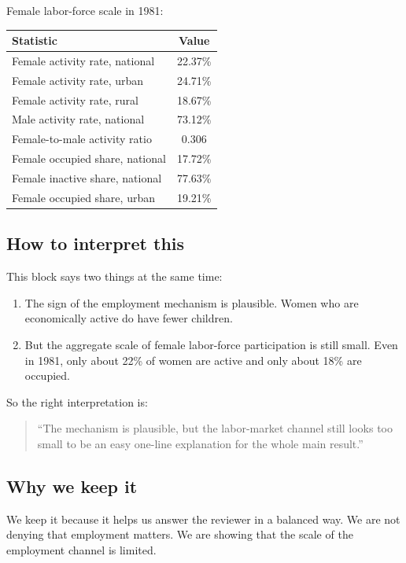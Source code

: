 \documentclass[11pt]{article}
\begin{document}
Female labor-force scale in 1981:

\begin{center}
\begin{tabular}{lc}
\toprule
Statistic & Value \\
\midrule
Female activity rate, national & 22.37\% \\
Female activity rate, urban & 24.71\% \\
Female activity rate, rural & 18.67\% \\
Male activity rate, national & 73.12\% \\
Female-to-male activity ratio & 0.306 \\
Female occupied share, national & 17.72\% \\
Female inactive share, national & 77.63\% \\
Female occupied share, urban & 19.21\% \\
\bottomrule
\end{tabular}
\end{center}

\subsection*{How to interpret this}

This block says two things at the same time:
\begin{enumerate}[leftmargin=*]
\item The sign of the employment mechanism is plausible. Women who are economically active do have fewer children.
\item But the aggregate scale of female labor-force participation is still small. Even in 1981, only about 22\% of women are active and only about 18\% are occupied.
\end{enumerate}

So the right interpretation is:

\begin{quote}
``The mechanism is plausible, but the labor-market channel still looks too small to be an easy one-line explanation for the whole main result.''
\end{quote}

\subsection*{Why we keep it}

We keep it because it helps us answer the reviewer in a balanced way. We are not denying that employment matters. We are showing that the scale of the employment channel is limited.
\end{document}
